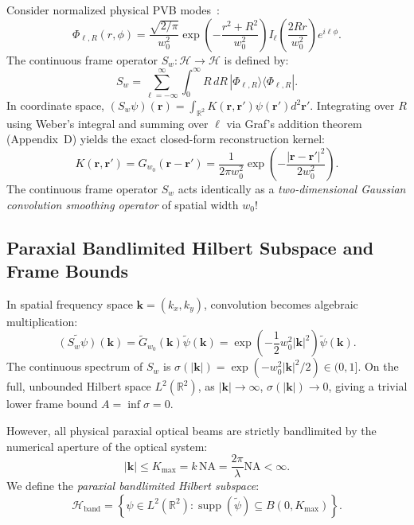 \documentclass{optica-article}
\begin{document}
Consider normalized physical PVB modes~\cite{Ferreira2026}:
\begin{equation}
\Phi_{\ell, R}(r, \phi) = \frac{\sqrt{2/\pi}}{w_0^2} \exp\left(-\frac{r^2 + R^2}{w_0^2}\right) I_\ell\left(\frac{2 R r}{w_0^2}\right) e^{i \ell \phi}.
\end{equation}
The continuous frame operator $S_w: \mathcal{H} \to \mathcal{H}$ is defined by:
\begin{equation}
S_w = \sum_{\ell=-\infty}^\infty \int_0^\infty R \, dR \, |\Phi_{\ell, R}\rangle \langle \Phi_{\ell, R}|.
\end{equation}
In coordinate space, $(S_w \psi)(\mathbf{r}) = \int_{\mathbb{R}^2} K(\mathbf{r}, \mathbf{r}') \psi(\mathbf{r}') d^2\mathbf{r}'$. Integrating over $R$ using Weber's integral and summing over $\ell$ via Graf's addition theorem (Appendix~D) yields the exact closed-form reconstruction kernel:
\begin{equation}
\boxed{K(\mathbf{r}, \mathbf{r}') = G_{w_0}(\mathbf{r} - \mathbf{r}') = \frac{1}{2\pi w_0^2} \exp\left(-\frac{|\mathbf{r} - \mathbf{r}'|^2}{2 w_0^2}\right).}
\label{eq:gaussian_kernel}
\end{equation}
The continuous frame operator $S_w$ acts identically as a \emph{two-dimensional Gaussian convolution smoothing operator} of spatial width $w_0$!

\subsection{Paraxial Bandlimited Hilbert Subspace and Frame Bounds}

In spatial frequency space $\mathbf{k} = (k_x, k_y)$, convolution becomes algebraic multiplication:
\begin{equation}
\widetilde{(S_w \psi)}(\mathbf{k}) = \widetilde{G}_{w_0}(\mathbf{k}) \widetilde{\psi}(\mathbf{k}) = \exp\left(-\frac{1}{2} w_0^2 |\mathbf{k}|^2\right) \widetilde{\psi}(\mathbf{k}).
\end{equation}
The continuous spectrum of $S_w$ is $\sigma(|\mathbf{k}|) = \exp(-w_0^2 |\mathbf{k}|^2 / 2) \in (0, 1]$. On the full, unbounded Hilbert space $L^2(\mathbb{R}^2)$, as $|\mathbf{k}| \to \infty$, $\sigma(|\mathbf{k}|) \to 0$, giving a trivial lower frame bound $A = \inf \sigma = 0$.

However, all physical paraxial optical beams are strictly bandlimited by the numerical aperture of the optical system:
\begin{equation}
|\mathbf{k}| \le K_{\max} = k \, \text{NA} = \frac{2\pi}{\lambda} \text{NA} < \infty.
\end{equation}
We define the \emph{paraxial bandlimited Hilbert subspace}:
\begin{equation}
\mathcal{H}_{\text{band}} = \left\{ \psi \in L^2(\mathbb{R}^2) : \operatorname{supp}(\widetilde{\psi}) \subseteq B(0, K_{\max}) \right\}.
\end{equation}
\end{document}
